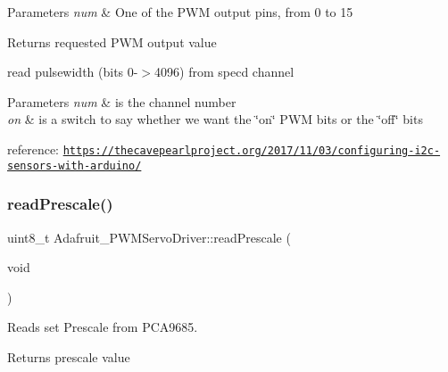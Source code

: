 \begin{DoxyParams}{Parameters}
{\em num} & One of the P\+WM output pins, from 0 to 15 \\
\hline
\end{DoxyParams}
\begin{DoxyReturn}{Returns}
requested P\+WM output value
\end{DoxyReturn}
read pulsewidth (bits 0-\/$>$4096) from spec\textquotesingle{}d channel 
\begin{DoxyParams}{Parameters}
{\em num} & is the channel number \\
\hline
{\em on} & is a switch to say whether we want the \char`\"{}on\char`\"{} P\+WM bits or the \char`\"{}off\char`\"{} bits\\
\hline
\end{DoxyParams}
reference\+: \href{https://thecavepearlproject.org/2017/11/03/configuring-i2c-sensors-with-arduino/}{\tt https\+://thecavepearlproject.\+org/2017/11/03/configuring-\/i2c-\/sensors-\/with-\/arduino/} \mbox{\label{classAdafruit__PWMServoDriver_a52dbe6fa4fa4a98d3082f239d59ad5f1}} 
\subsubsection{\texorpdfstring{read\+Prescale()}{readPrescale()}}
{\footnotesize\ttfamily uint8\+\_\+t Adafruit\+\_\+\+P\+W\+M\+Servo\+Driver\+::read\+Prescale (\begin{DoxyParamCaption}\item[{void}]{ }\end{DoxyParamCaption})}



Reads set Prescale from P\+C\+A9685. 

\begin{DoxyReturn}{Returns}
prescale value 
\end{DoxyReturn}
\mbox{\label{classAdafruit__PWMServoDriver_a7967e51188cbacf2c3f269c8aec9d292}} 
